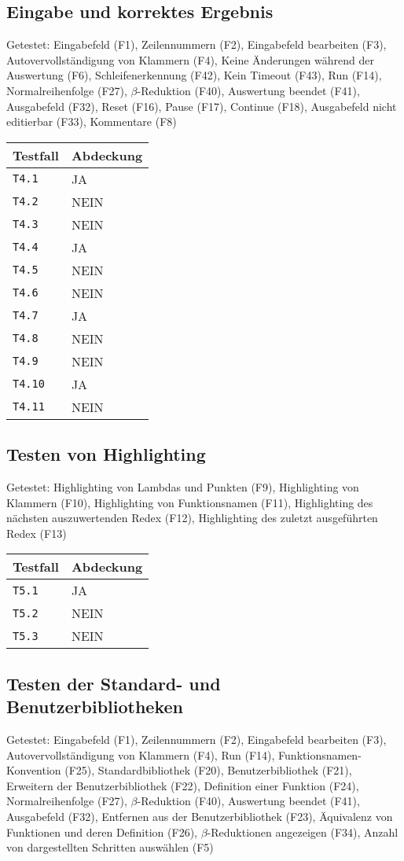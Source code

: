 \documentclass[parskip=full,11pt,twoside]{scrartcl}
\newcommand{\testline}[2]{
    \texttt{#1} & \ifthenelse{\equal{#2}{JA}}{\cellcolor{green!20}}{\cellcolor{red!20}}#2 \\ \hline
}
\begin{document}
\subsection{Eingabe und korrektes Ergebnis}
    Getestet:
    Eingabefeld (F1),
    Zeilennummern (F2),
    Eingabefeld bearbeiten (F3),
    Autovervollständigung von Klammern (F4),
    Keine Änderungen während der Auswertung (F6),
    Schleifenerkennung (F42),
    Kein Timeout (F43),
    Run (F14),
    Normalreihenfolge (F27),
    $\beta$-Reduktion (F40),
    Auswertung beendet (F41),
    Ausgabefeld (F32),
    Reset (F16),
    Pause (F17),
    Continue (F18),
    Ausgabefeld nicht editierbar (F33),
    Kommentare (F8)

    \label{shortcuts}
    \begin{center}
        \begin{tabular}{ p{9cm} p{4cm}}
            Testfall & Abdeckung \\ \hline
            \testline{T4.1}{JA}
            \testline{T4.2}{NEIN}
            \testline{T4.3}{NEIN}
            \testline{T4.4}{JA}
            \testline{T4.5}{NEIN}
            \testline{T4.6}{NEIN}
            \testline{T4.7}{JA}
            \testline{T4.8}{NEIN}
            \testline{T4.9}{NEIN}
            \testline{T4.10}{JA}
            \testline{T4.11}{NEIN}
        \end{tabular}
    \end{center}

\subsection{Testen von Highlighting}
    Getestet:
    Highlighting von Lambdas und Punkten (F9),
    Highlighting von Klammern (F10),
    Highlighting von Funktionsnamen (F11),
    Highlighting des nächsten auszuwertenden Redex (F12),
    Highlighting des zuletzt ausgeführten Redex (F13)

    \label{shortcuts}
    \begin{center}
        \begin{tabular}{ p{9cm} p{4cm}}
            Testfall & Abdeckung \\ \hline
            \testline{T5.1}{JA}
            \testline{T5.2}{NEIN}
            \testline{T5.3}{NEIN}
        \end{tabular}
    \end{center}

\subsection{Testen der Standard- und Benutzerbibliotheken}
    Getestet:
    Eingabefeld (F1),
    Zeilennummern (F2),
    Eingabefeld bearbeiten (F3),
    Autovervollständigung von Klammern (F4),
    Run (F14),
    Funktionsnamen-Konvention (F25),
    Standardbibliothek (F20),
    Benutzerbibliothek (F21),
    Erweitern der Benutzerbibliothek (F22),
    Definition einer Funktion (F24),
    Normalreihenfolge (F27),
    $\beta$-Reduktion (F40),
    Auswertung beendet (F41),
    Ausgabefeld (F32),
    Entfernen aus der Benutzerbibliothek (F23),
    Äquivalenz von Funktionen und deren Definition (F26),
    $\beta$-Reduktionen angezeigen (F34),
    Anzahl von dargestellten Schritten auswählen (F5)
\end{document}
